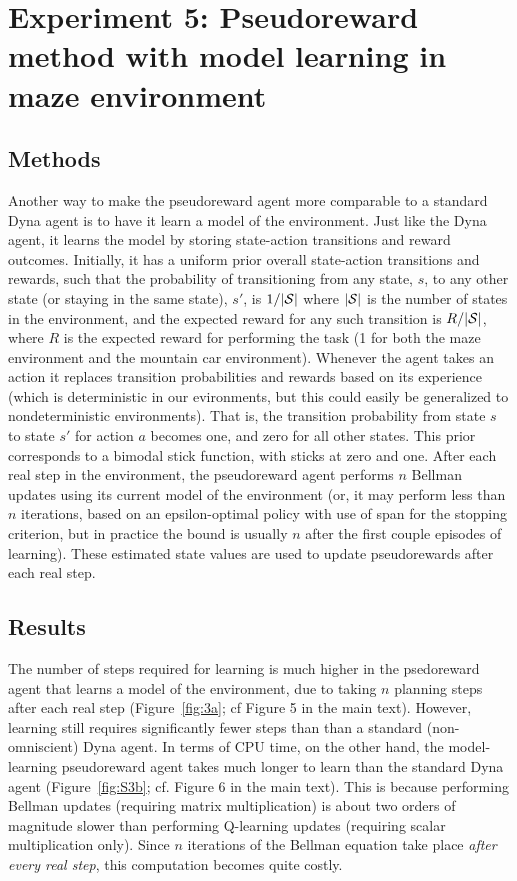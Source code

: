 \documentclass[letterpaper]{article}
\begin{document}
\pagebreak

\section{Experiment 5: Pseudoreward method with model learning in maze environment}

\subsection{Methods}

Another way to make the pseudoreward agent more comparable to a standard Dyna agent is to have it learn a model of the environment. Just like the Dyna agent, it learns the model by storing state-action transitions and reward outcomes. Initially, it has a uniform prior overall state-action transitions and rewards, such that the probability of transitioning from any state, $s$, to any other state (or staying in the same state), $s'$, is $1/|{\cal S}|$ where $|{\cal S}|$ is the number of states in the environment, and the expected reward for any such transition is $R/|{\cal S}|$, where $R$ is the expected reward for performing the task (1 for both the maze environment and the mountain car environment). Whenever the agent takes an action it replaces transition probabilities and rewards based on its experience (which is deterministic in our evironments, but this could easily be generalized to nondeterministic environments). That is, the transition probability from state $s$ to state $s'$ for action $a$ becomes one, and zero for all other states. This prior corresponds to a bimodal stick function, with sticks at zero and one. After each real step in the environment, the pseudoreward agent performs $n$ Bellman updates using its current model of the environment (or, it may perform less than $n$ iterations, based on an epsilon-optimal policy with use of span for the stopping criterion, but in practice the bound is usually $n$ after the first couple episodes of learning). These estimated state values are used to update pseudorewards after each real step.

\subsection{Results}


The number of steps required for learning is much higher in the psedoreward agent that learns a model of the environment, due to taking $n$ planning steps after each real step (Figure~\ref{fig:3a}; cf Figure 5 in the main text). However, learning still requires significantly fewer steps than than a standard (non-omniscient) Dyna agent. In terms of CPU time, on the other hand, the model-learning pseudoreward agent takes much longer to learn than the standard Dyna agent (Figure~\ref{fig:S3b}; cf. Figure 6 in the main text). This is because performing Bellman updates (requiring matrix multiplication) is about two orders of magnitude slower than performing Q-learning updates (requiring scalar multiplication only). Since $n$ iterations of the Bellman equation take place \textit{after every real step}, this computation becomes quite costly.
\end{document}
